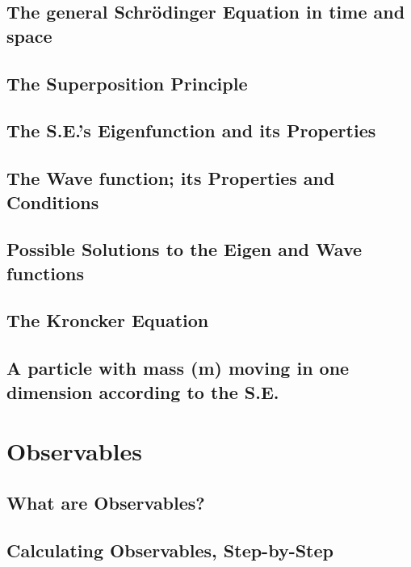 \documentclass[colorlinks,11pt,a4paper,normalphoto,withhyper,ragged2e]{altareport}
\begin{document}
	\subsection{The general Schrödinger Equation in time and space}
	
	
	\subsection{The Superposition Principle}
	
	
	\subsection{The S.E.’s Eigenfunction and its Properties}
	
	
	\subsection{The Wave function; its Properties and Conditions}
	
	
	\subsection{Possible Solutions to the Eigen and Wave functions}
	
	
	\subsection{The Kroncker Equation}
	
	
	\subsection{A particle with mass (m) moving in one dimension according to the S.E.}
	
	
	\pagebreak
	
	
	
	
\section{Observables}
	
	\subsection{What are Observables?}
	
	
	\subsection{Calculating Observables, Step-by-Step}
	
\end{document}
